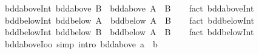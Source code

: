 \begin{isabellebody}
\isanewline
%
\endisadelimproof
\isanewline
{}\isamarkupfalse%
\ bdd{\isacharunderscore}{\kern0pt}above{\isacharunderscore}{\kern0pt}Int{}{\isacharcolon}{\kern0pt}\ {\isachardoublequoteopen}bdd{\isacharunderscore}{\kern0pt}above\ B\ {\isasymLongrightarrow}\ bdd{\isacharunderscore}{\kern0pt}above\ {\isacharparenleft}{\kern0pt}A\ {\isasyminter}\ B{\isacharparenright}{\kern0pt}{\isachardoublequoteclose}\isanewline
%
\isadelimproof
\ \ %
\endisadelimproof
%
\isatagproof
{}\isamarkupfalse%
\ {\isacharparenleft}{\kern0pt}fact\ bdd{\isacharunderscore}{\kern0pt}above{\isachardot}{\kern0pt}Int{}{\isacharparenright}{\kern0pt}%
\endisatagproof
{\isafoldproof}%
%
\isadelimproof
\isanewline
%
\endisadelimproof
\isanewline
{}\isamarkupfalse%
\ bdd{\isacharunderscore}{\kern0pt}below{\isacharunderscore}{\kern0pt}Int{}{\isacharcolon}{\kern0pt}\ {\isachardoublequoteopen}bdd{\isacharunderscore}{\kern0pt}below\ A\ {\isasymLongrightarrow}\ bdd{\isacharunderscore}{\kern0pt}below\ {\isacharparenleft}{\kern0pt}A\ {\isasyminter}\ B{\isacharparenright}{\kern0pt}{\isachardoublequoteclose}\isanewline
%
\isadelimproof
\ \ %
\endisadelimproof
%
\isatagproof
{}\isamarkupfalse%
\ {\isacharparenleft}{\kern0pt}fact\ bdd{\isacharunderscore}{\kern0pt}below{\isachardot}{\kern0pt}Int{}{\isacharparenright}{\kern0pt}%
\endisatagproof
{\isafoldproof}%
%
\isadelimproof
\isanewline
%
\endisadelimproof
\isanewline
{}\isamarkupfalse%
\ bdd{\isacharunderscore}{\kern0pt}below{\isacharunderscore}{\kern0pt}Int{}{\isacharcolon}{\kern0pt}\ {\isachardoublequoteopen}bdd{\isacharunderscore}{\kern0pt}below\ B\ {\isasymLongrightarrow}\ bdd{\isacharunderscore}{\kern0pt}below\ {\isacharparenleft}{\kern0pt}A\ {\isasyminter}\ B{\isacharparenright}{\kern0pt}{\isachardoublequoteclose}\isanewline
%
\isadelimproof
\ \ %
\endisadelimproof
%
\isatagproof
{}\isamarkupfalse%
\ {\isacharparenleft}{\kern0pt}fact\ bdd{\isacharunderscore}{\kern0pt}below{\isachardot}{\kern0pt}Int{}{\isacharparenright}{\kern0pt}%
\endisatagproof
{\isafoldproof}%
%
\isadelimproof
\isanewline
%
\endisadelimproof
\isanewline
{}\isamarkupfalse%
\ bdd{\isacharunderscore}{\kern0pt}above{\isacharunderscore}{\kern0pt}Ioo\ {\isacharbrackleft}{\kern0pt}simp{\isacharcomma}{\kern0pt}\ intro{\isacharbrackright}{\kern0pt}{\isacharcolon}{\kern0pt}\ {\isachardoublequoteopen}bdd{\isacharunderscore}{\kern0pt}above\ {\isacharbraceleft}{\kern0pt}a\ {\isacharless}{\kern0pt}{\isachardot}{\kern0pt}{\isachardot}{\kern0pt}{\isacharless}{\kern0pt}\ b{\isacharbraceright}{\kern0pt}{\isachardoublequoteclose}\isanewline

\end{isabellebody}
